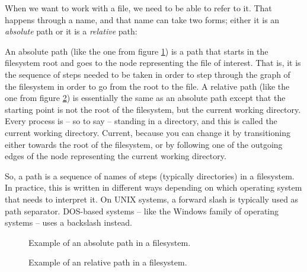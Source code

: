 When we want to work with a file, we need to be able to refer to it. That happens through a name, and that name can take two forms; either it is an \textsl{absolute} path or it is a \textsl{relative} path:
\begin{itemize}
   An absolute path (like the one from figure \ref{fig:bs:fs:path:abs}) is a path that starts in the filesystem root and goes to the node representing the file of interest. That is, it is the sequence of steps needed to be taken in order to step through the graph of the filesystem in order to go from the root to the file.
   A relative path (like the one from figure \ref{fig:bs:fs:path:rel}) is essentially the same as an absolute path except that the starting point is not the root of the filesystem, but the current working directory. Every process is -- so to say -- standing in a directory, and this is called the current working directory. Current, because you can change it by transitioning either towards the root of the filesystem, or by following one of the outgoing edges of the node representing the current working directory.
\end{itemize}

So, a path is a sequence of names of steps (typically directories) in a filesystem. In practice, this is written in different ways depending on which operating system that needs to interpret it. On UNIX systems, a forward slash \say{/} is typically used as path separator. DOS-based systems -- like the Windows family of operating systems -- uses a backslash \say{\textbackslash} instead.

\begin{figure}[tbp]
  
  \caption{Example of an absolute path in a filesystem.}
  \label{fig:bs:fs:path:abs}
\end{figure}

\begin{figure}[tbp]
  
  \caption{Example of an relative path in a filesystem.}
  \label{fig:bs:fs:path:rel}
\end{figure}

